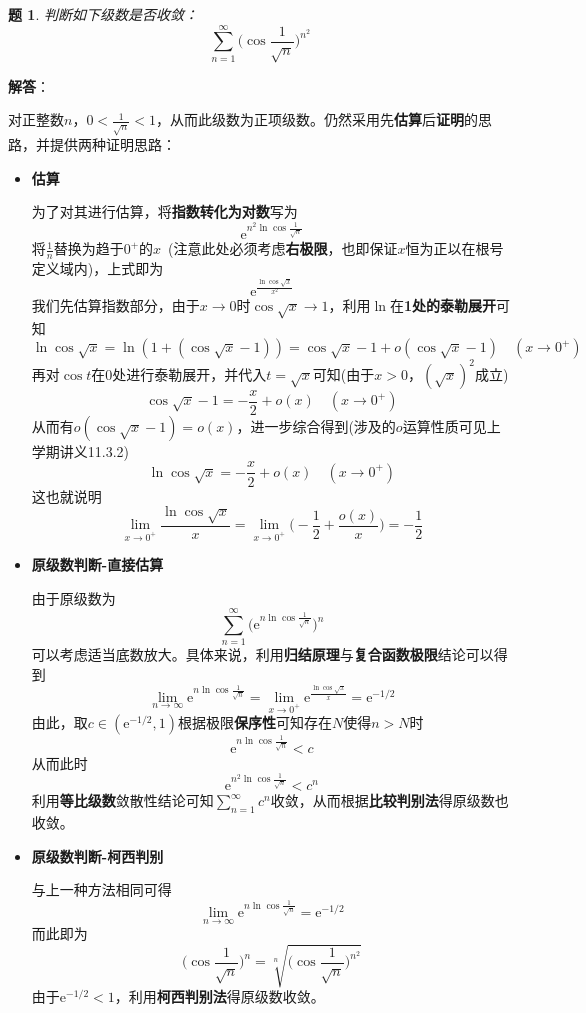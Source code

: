 \documentclass[a4paper,UTF8,fontset=windows,AutoFakeBold]{ctexart}
\newcommand*{\er}{\mathrm{e}}
\newcommand*{\suminf}[1][n=1]{\sum_{#1}^\infty}
\theoremstyle{ex}
\newtheorem{exercise}{题}
\newcommand{\sol}[1]{{\vspace{5pt}\kaishu\noindent\textbf{解答}：\vspace{-3pt}
\begin{compactitem}
    \item[] #1
\end{compactitem}
}}
\begin{document}
\begin{framed}
\begin{exercise}
    判断如下级数是否收敛：
    $$\suminf\bigg(\cos\frac{1}{\sqrt{n}}\bigg)^{n^2}$$
\end{exercise}
\sol{
    对正整数$n$，$0<\frac{1}{\sqrt{n}}<1$，从而此级数为正项级数。仍然采用先\textbf{估算}后\textbf{证明}的思路，并提供两种证明思路：
    \begin{itemize}
        \item \textbf{估算}
        
        为了对其进行估算，将\textbf{指数转化为对数}写为
        $$\er^{n^2\ln\cos\frac{1}{\sqrt{n}}}$$
        将$\frac{1}{n}$替换为趋于$0^+$的$x$\ (注意此处必须考虑\textbf{右极限}，也即保证$x$恒为正以在根号定义域内)，上式即为
        $$\er^{\frac{\ln\cos\sqrt{x}}{x^2}}$$
        我们先估算指数部分，由于$x\to0$时$\cos\sqrt{x}\to1$，利用$\ln$在\textbf{1处的泰勒展开}可知
        $$\ln\cos\sqrt{x}=\ln(1+(\cos\sqrt{x}-1))=\cos\sqrt{x}-1+o(\cos\sqrt{x}-1)\quad(x\to0^+)$$
        再对$\cos t$在0处进行泰勒展开，并代入$t=\sqrt{x}$可知(由于$x>0$，$(\sqrt{x})^2$成立)
        $$\cos\sqrt{x}-1=-\frac{x}{2}+o(x)\quad(x\to0^+)$$
        从而有$o(\cos\sqrt{x}-1)=o(x)$，进一步综合得到(涉及的$o$运算性质可见上学期讲义11.3.2)
        $$\ln\cos\sqrt{x}=-\frac{x}{2}+o(x)\quad(x\to0^+)$$
        这也就说明
        $$\lim_{x\to0^+}\frac{\ln\cos\sqrt{x}}{x}=\lim_{x\to0^+}\bigg(-\frac{1}{2}+\frac{o(x)}{x}\bigg)=-\frac{1}{2}$$

        \item \textbf{原级数判断-直接估算}
        
        由于原级数为
        $$\suminf\big(\er^{n\ln\cos\frac{1}{\sqrt{n}}}\big)^n$$
        可以考虑适当底数放大。具体来说，利用\textbf{归结原理}与\textbf{复合函数极限}结论可以得到
        $$\lim_{n\to\infty}\er^{n\ln\cos\frac{1}{\sqrt{n}}}=\lim_{x\to0^+}\er^{\frac{\ln\cos\sqrt{x}}{x}}=\er^{-1/2}$$
        由此，取$c\in(\er^{-1/2},1)$根据极限\textbf{保序性}可知存在$N$使得$n>N$时
        $$\er^{n\ln\cos\frac{1}{\sqrt{n}}}<c$$
        从而此时
        $$\er^{n^2\ln\cos\frac{1}{\sqrt{n}}}<c^n$$
        利用\textbf{等比级数}敛散性结论可知$\suminf c^n$收敛，从而根据\textbf{比较判别法}得原级数也收敛。

        \item \textbf{原级数判断-柯西判别}
        
        与上一种方法相同可得
        $$\lim_{n\to\infty}\er^{n\ln\cos\frac{1}{\sqrt{n}}}=\er^{-1/2}$$
        而此即为
        $$\bigg(\cos\frac{1}{\sqrt{n}}\bigg)^n=\sqrt[n]{\bigg(\cos\frac{1}{\sqrt{n}}\bigg)^{n^2}}$$
        由于$\er^{-1/2}<1$，利用\textbf{柯西判别法}得原级数收敛。
    \end{itemize}
}
\end{framed}
\end{document}
